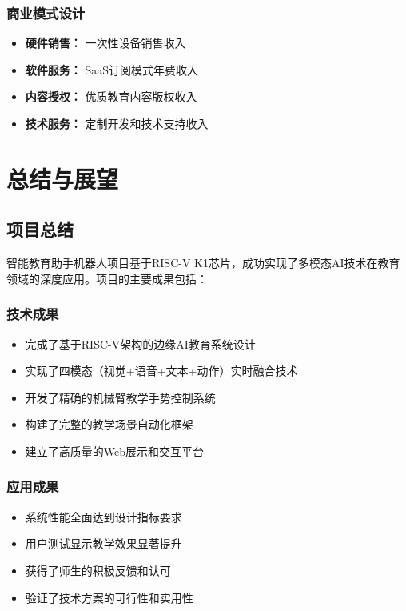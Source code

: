 \documentclass[12pt,a4paper]{article}
\begin{document}
\subsubsection{商业模式设计}
\begin{itemize}[leftmargin=2em]
    \item \textbf{硬件销售：} 一次性设备销售收入
    \item \textbf{软件服务：} SaaS订阅模式年费收入
    \item \textbf{内容授权：} 优质教育内容版权收入
    \item \textbf{技术服务：} 定制开发和技术支持收入
\end{itemize}

\newpage

\section{总结与展望}

\subsection{项目总结}

智能教育助手机器人项目基于RISC-V K1芯片，成功实现了多模态AI技术在教育领域的深度应用。项目的主要成果包括：

\subsubsection{技术成果}
\begin{itemize}[leftmargin=2em]
    \item 完成了基于RISC-V架构的边缘AI教育系统设计
    \item 实现了四模态（视觉+语音+文本+动作）实时融合技术
    \item 开发了精确的机械臂教学手势控制系统
    \item 构建了完整的教学场景自动化框架
    \item 建立了高质量的Web展示和交互平台
\end{itemize}

\subsubsection{应用成果}
\begin{itemize}[leftmargin=2em]
    \item 系统性能全面达到设计指标要求
    \item 用户测试显示教学效果显著提升
    \item 获得了师生的积极反馈和认可
    \item 验证了技术方案的可行性和实用性
\end{itemize}
\end{document}
